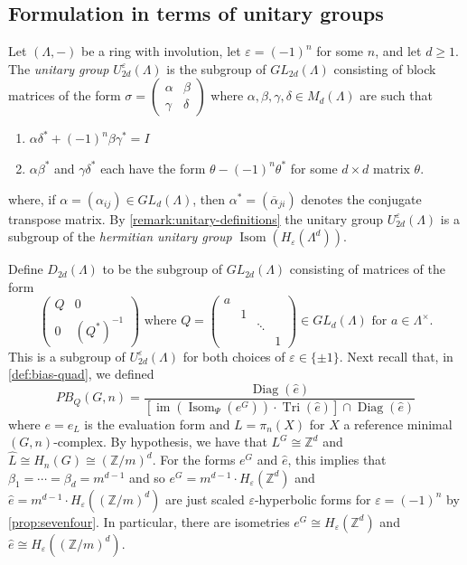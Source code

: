 \documentclass[11pt,a4paper,leqno]{amsart}
\theoremstyle{definition}
\theoremstyle{remark}
\newcommand{\wh}{\widehat}
\newcommand{\Z}{\mathbb{Z}}
\DeclareMathOperator{\IM}{im}
\DeclareMathOperator{\Isom}{Isom}
\DeclareMathOperator{\DiagIsom}{Diag}
\DeclareMathOperator{\TriIsom}{Tri}
\renewcommand{\l}{\Lambda}
\newcommand{\La}{\Lambda}
\newcommand{\wbar}[1]{\overline{#1} }
\newcommand{\ep}{\varepsilon}
\newcommand{\U}{U^{\varepsilon}}
\begin{document}
\subsection{Formulation in terms of unitary groups} \label{ss:PB-to-U}

Let $(\l,-)$ be a ring with involution, let $\varepsilon =(-1)^n$ for some $n$, and let $d \ge 1$. The \textit{unitary group} $\U_{2d}(\La)$ is the subgroup of $GL_{2d}(\l)$ consisting of block matrices of the form
$\sigma = \left(\begin{smallmatrix} \alpha & \beta \\ \gamma & \delta \end{smallmatrix}\right)$
where $\alpha,\beta,\gamma, \delta \in M_d(\l)$ are such that
\begin{enumerate}
\item $\alpha \delta^* + (-1)^n\beta \gamma^* = I$
\item $\alpha\beta^*$ and $\gamma \delta^*$ each have the form $\theta - (-1)^n\theta^*$ for some  $d\times d$ matrix $\theta$.
\end{enumerate}
where, if $\alpha =(\alpha_{ij}) \in GL_{d}(\La)$, then $\alpha^* = (\wbar{\alpha}_{ji}) $ denotes the conjugate transpose matrix.
By \cref{remark:unitary-definitions} the unitary group $\U_{2d}(\La)$ is a subgroup of the \textit{hermitian unitary group} $\Isom(H_\ep(\l^d))$.

Define $D_{2d}(\l)$ to be the subgroup of $GL_{2d}(\l)$ consisting of matrices of the form 
\[ \left(\begin{smallmatrix} Q & 0 \\ 0 & (Q^*)^{-1} \end{smallmatrix}\right) \text{ where $Q = \left(\begin{smallmatrix} a &  & &  \\ &  1 & &  \\ &  & \ddots &  \\ &  & & 1 \end{smallmatrix}\right) \in GL_d(\l)$ for $a \in \La^\times$}. \]
This is a subgroup of $\U_{2d}(\La)$ for both choices of $\varepsilon \in \{\pm 1\}$.
Next recall that, in \cref{def:bias-quad}, we defined
\[ PB_Q(G,n) = \frac{\DiagIsom(\wh e)}{\left [\IM(\Isom_\Psi(e^G)) \cdot \TriIsom(\wh e)\right ] \cap \DiagIsom(\wh e)} \]	
where $e=e_L$ is the evaluation form and $L = \pi_n(X)$ for $X$ a reference minimal $(G,n)$-complex.
By hypothesis, we have that $L^G \cong \Z^d$ and $\wh L \cong H_n(G) \cong (\Z/m)^d$.
For the forms $e^G$ and $\wh e$, this implies that $\beta_1 = \cdots = \beta_d = m^{d-1}$ and so $e^G = m^{d-1} \cdot H_\ep(\Z^d)$ and $\wh e = m^{d-1} \cdot H_\ep((\Z/m)^d)$ are just scaled $\varepsilon$-hyperbolic forms for $\varepsilon=(-1)^n$ by \cref{prop:sevenfour}. In particular, there are isometries $e^G \cong H_\ep(\Z^d)$ and $\wh e \cong H_\ep((\Z/m)^d)$.
\end{document}
